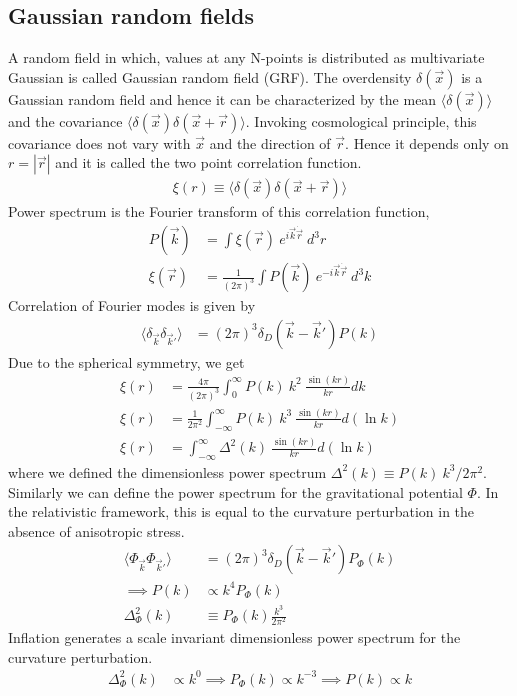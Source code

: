\documentclass[12pt]{article}
\begin{document}
\subsection{Gaussian random fields}
A random field in which, values at any N-points is distributed as multivariate Gaussian is called Gaussian random field (GRF). The overdensity $\delta(\vec{x})$ is a Gaussian random field and hence it can be characterized by the mean $\langle \delta(\vec{x}) \rangle$ and the covariance $\langle \delta(\vec{x}) \delta(\vec{x} + \vec{r}) \rangle$. Invoking cosmological principle, this covariance does not vary with $\vec{x}$ and the direction of $\vec{r}$. Hence it depends only on $r = |\vec{r}|$ and it is called the two point correlation function.
\begin{align}
\xi(r) \equiv \langle \delta(\vec{x}) \delta(\vec{x} + \vec{r}) \rangle
\end{align}
Power spectrum is the Fourier transform of this correlation function,
\begin{align}
P(\vec{k}) &= \int \xi(\vec{r}) ~e^{i \vec{k} \dot \vec{r}} ~d^3r\\
\xi(\vec{r}) &= \frac{1}{(2\pi)^3} \int P(\vec{k}) ~e^{-i \vec{k} \dot \vec{r}} ~d^3 k
\end{align}
Correlation of Fourier modes is given by
\begin{align}
\langle \delta_{\vec{k}} \delta_{\vec{k}'} \rangle &= (2 \pi)^3 \delta_{D} (\vec{k} - \vec{k}') P(k)
\end{align}
Due to the spherical symmetry, we get
\begin{align}
\xi(r) &= \frac{4 \pi}{(2\pi)^3} \int_{0}^{\infty} P(k) ~k^2 ~\frac{\sin(kr)}{kr} dk\\
\xi(r) &= \frac{1}{2\pi^2} \int_{-\infty}^{\infty} P(k) ~k^3 ~\frac{\sin(kr)}{kr} d(\ln k)\\
\xi(r) &= \int_{-\infty}^{\infty} \Delta^2(k) ~\frac{\sin(kr)}{kr} d(\ln k)
\end{align}
where we defined the dimensionless power spectrum $\Delta^2(k) \equiv P(k) ~{k^3}/{2 \pi^2}$.\\
Similarly we can define the power spectrum for the gravitational potential $\Phi$. In the relativistic framework, this is equal to the curvature perturbation in the absence of anisotropic stress.
\begin{align}
\langle \Phi_{\vec{k}} \Phi_{\vec{k}'} \rangle &= (2 \pi)^3 \delta_{D} (\vec{k} - \vec{k}') P_{\Phi}(k)\\
\implies P(k) &\propto k^4 P_{\Phi}(k)\\
\Delta_{\Phi}^2(k) &\equiv P_{\Phi}(k) \frac{k^3}{2 \pi^2}
\end{align}
Inflation generates a scale invariant dimensionless power spectrum for the curvature perturbation.
\begin{align}
\Delta_{\Phi}^2(k) &\propto k^{0} \implies P_{\Phi}(k) \propto k^{-3} \implies P(k) \propto k
\end{align}
\end{document}

